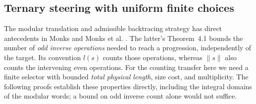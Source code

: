 \subsection{Ternary steering with uniform finite choices}

The modular translation and admissible backtracing strategy has direct
antecedents in Monks and Monks et al.
\cite{monks-2006,monks-et-al-2013}. The latter's Theorem~4.1 bounds the
number of \emph{odd inverse operations} needed to reach a progression,
independently of the target. Its convention $l(s)$ counts those operations,
whereas $\|s\|$ also counts the intervening even operations.
For the counting transfer here we need a finite selector with bounded
\emph{total physical length}, size cost, and multiplicity. The following
proofs establish these properties directly, including the integral domains
of the modular words; a bound on odd inverse count alone would not suffice.

